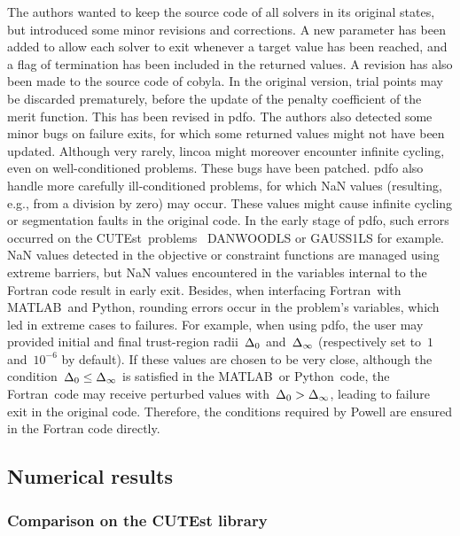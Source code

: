 \documentclass[11pt,draft]{article}
\numberwithin{equation}{section}
\newcommand{\rad}[1][k]{\Delta\ifthenelse{\equal{#1}{}}{}{_{#1}}}
\def\cutest{\mbox{CUTEst}}
\def\fortran{\mbox{Fortran}}
\def\matlab{\mbox{MATLAB}}
\def\python{\mbox{Python}}
\begin{document}
The authors wanted to keep the source code of all solvers in its original states, but introduced some minor revisions and corrections.
A new parameter has been added to allow each solver to exit whenever a target value has been reached, and a flag of termination has been included in the returned values.
A revision has also been made to the source code of \gls{cobyla}.
In the original version, trial points may be discarded prematurely, before the update of the penalty coefficient of the merit function.
This has been revised in \gls{pdfo}.
The authors also detected some minor bugs on failure exits, for which some returned values might not have been updated.
Although very rarely, \gls{lincoa} might moreover encounter infinite cycling, even on well-conditioned problems.
These bugs have been patched.
\Gls{pdfo} also handle more carefully ill-conditioned problems, for which NaN values (resulting, e.g., from a division by zero) may occur.
These values might cause infinite cycling or segmentation faults in the original code.
In the early stage of \gls{pdfo}, such errors occurred on the \cutest\ problems~\cite{Gould_Orban_Toint_2015} DANWOODLS or GAUSS1LS for example.
NaN values detected in the objective or constraint functions are managed using extreme barriers, but NaN values encountered in the variables internal to the Fortran code result in early exit.
Besides, when interfacing \fortran\ with \matlab\ and \python, rounding errors occur in the problem's variables, which led in extreme cases to failures.
For example, when using \gls{pdfo}, the user may provided initial and final trust-region radii~$\rad[0]$ and~$\rad[\infty]$ (respectively set to~$1$ and~$10^{-6}$ by default).
If these values are chosen to be very close, although the condition~$\rad[0] \le \rad[\infty]$ is satisfied in the \matlab\ or \python\ code, the \fortran\ code may receive perturbed values with~$\rad[0] > \rad[\infty]$, leading to failure exit in the original code.
Therefore, the conditions required by Powell are ensured in the Fortran code directly.

\subsection{Numerical results}

\subsubsection{Comparison on the CUTEst library}
\end{document}

